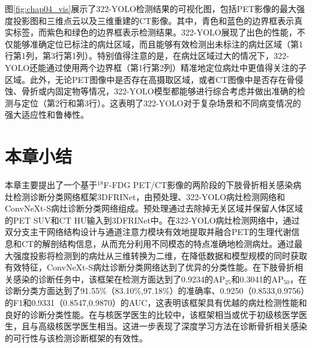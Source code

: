 图\ref{fig:chap04_vis}展示了322-YOLO检测结果的可视化图，包括PET影像的最大强度投影图和三维点云以及三维重建的CT影像。其中，青色和蓝色的边界框表示真实标签，而紫色和绿色的边界框表示检测结果。322-YOLO展现了出色的性能，不仅能够准确定位已标注的病灶区域，而且能够有效检测出未标注的病灶区域（第1行第1列，第3行第1列）。特别值得注意的是，在病灶区域过大的情况下，322-YOLO还能通过使用两个边界框（第1行第2列）精准地定位病灶中更值得关注的子区域。此外，无论PET图像中是否存在高摄取区域，或者CT图像中是否存在骨侵蚀、骨折或内固定物等情况，322-YOLO模型都能够进行综合考虑并做出准确的检测与定位（第2行和第3行）。这表明了322-YOLO对于复杂场景和不同病变情况的强大适应性和鲁棒性。

\section{本章小结}

本章主要提出了一个基于\(^{18}\)F-FDG PET/CT影像的两阶段的下肢骨折相关感染病灶检测诊断分类网络框架3DFRINet，由预处理、322-YOLO病灶检测网络和ConvNeXt-S病灶诊断分类网络组成。预处理通过去除掉无关区域并保留人体区域的PET SUV和CT HU输入到3DFRINet中。在322-YOLO病灶检测网络中，通过双分支主干网络结构设计与通道注意力模块有效地提取并融合PET的生理代谢信息和CT的解剖结构信息，从而充分利用不同模态的特点准确地检测病灶。通过最大强度投影将检测到的病灶从三维转换为二维，在降低数据和模型规模的同时获取有效特征，ConvNeXt-S病灶诊断分类网络达到了优异的分类性能。在下肢骨折相关感染的诊断任务中，该框架在检测方面达到了0.9234的AP\(_{25}\)和0.3041的AP\(_{50}\)，在诊断分类方面达到了91.55\%（83.10\%,97.18\%）的准确率、0.9250（0.8533,0.9756）的F1和0.9331（0.8547,0.9870）的AUC，这表明该框架具有优越的病灶检测性能和良好的诊断分类性能。在与核医学医生的比较中，该框架相当或优于初级核医学医生，且与高级核医学医生相当。这进一步表现了深度学习方法在诊断骨折相关感染的可行性与该检测诊断框架的有效性。